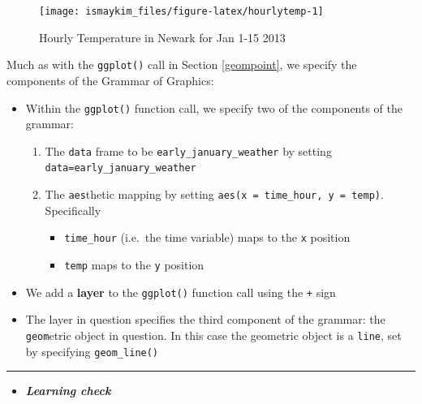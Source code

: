 \documentclass[]{tufte-book}
\let\oldrule=\rule
\renewcommand{\rule}[1]{\oldrule{\linewidth}}
\providecommand{\tightlist}{%
  \setlength{\itemsep}{0pt}\setlength{\parskip}{0pt}}
\newenvironment{rmdblock}[1]
  {\begin{shaded*}
  \begin{itemize}
  \renewcommand{\labelitemi}{
    \raisebox{-.7\height}[0pt][0pt]{
    }
  }
  \item
  }
  {
  \end{itemize}
  \end{shaded*}
  }
\newenvironment{learncheck}
  {\begin{rmdblock}{warning}}
  {\end{rmdblock}}
\begin{document}
\begin{figure}

{\centering \texttt{[image: ismaykim\_files/figure-latex/hourlytemp-1]} 

}

\caption[Hourly Temperature in Newark for Jan 1-15 2013]{Hourly Temperature in Newark for Jan 1-15 2013}\label{fig:hourlytemp}
\end{figure}

Much as with the \texttt{ggplot()} call in Section \ref{geompoint}, we
specify the components of the Grammar of Graphics:

\begin{itemize}
\tightlist
\item
  Within the \texttt{ggplot()} function call, we specify two of the
  components of the grammar:

  \begin{enumerate}
  \def\labelenumi{\arabic{enumi}.}
  \tightlist
  \item
    The \texttt{data} frame to be \texttt{early\_january\_weather} by
    setting \texttt{data=early\_january\_weather}
  \item
    The \texttt{aes}thetic mapping by setting
    \texttt{aes(x\ =\ time\_hour,\ y\ =\ temp)}. Specifically

    \begin{itemize}
    \tightlist
    \item
      \texttt{time\_hour} (i.e.~the time variable) maps to the
      \texttt{x} position
    \item
      \texttt{temp} maps to the \texttt{y} position
    \end{itemize}
  \end{enumerate}
\item
  We add a \textbf{layer} to the \texttt{ggplot()} function call using
  the \texttt{+} sign
\item
  The layer in question specifies the third component of the grammar:
  the \texttt{geom}etric object in question. In this case the geometric
  object is a \texttt{line}, set by specifying \texttt{geom\_line()}
\end{itemize}

\begin{center}\rule{0.5\linewidth}{\linethickness}\end{center}

\begin{learncheck}
\textbf{\emph{Learning check}}
\end{learncheck}
\end{document}
